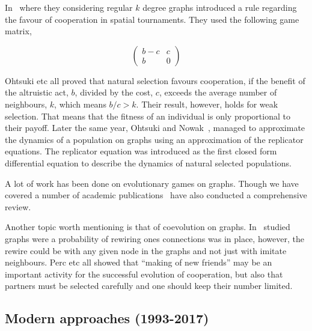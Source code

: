 \documentclass{article}
\theoremstyle{definition}
\begin{document}
In~\cite{Ohtsuki2006} where they considering regular \(k\) degree graphs
introduced a rule regarding the favour of cooperation in spatial tournaments.
They used the following game matrix,

\begin{equation} \label{eq:the_pd_payoffs}
    \begin{pmatrix}
        b - c & c \\ b & 0
    \end{pmatrix}
\end{equation}


Ohtsuki etc all proved that natural selection favours cooperation, if the benefit
of the altruistic act, \(b\), divided by the cost, \(c\), exceeds the average number of
neighbours, \(k\), which means \(b/c > k\). Their result, however, holds for
weak selection. That means that the fitness of an individual is only proportional
to their payoff. Later the same year, Ohtsuki and Nowak~\cite{Ohtsuki2006replicator},
managed to approximate the dynamics of a population on graphs using an approximation of the
replicator equations. The replicator equation was introduced as the first closed
form differential equation to describe the dynamics of natural selected populations.

A lot of work has been done on evolutionary games on graphs. Though we have covered
a number of academic publications~\cite{szabo2007} have also conducted a comprehensive
review.

Another topic worth mentioning is that of coevolution on graphs. In~\cite{Perc2011}
studied graphs were a probability of rewiring ones connections was in place,
however, the rewire could be with any given node in the graphs and not just
with imitate neighbours. Perc etc all showed that ``making of new friends'' may
be an important activity for the successful evolution of cooperation,
but also that partners must be selected carefully and one should keep their number
limited.

\subsection{Modern approaches (1993-2017)}\label{section:modern_approaches}
\end{document}
